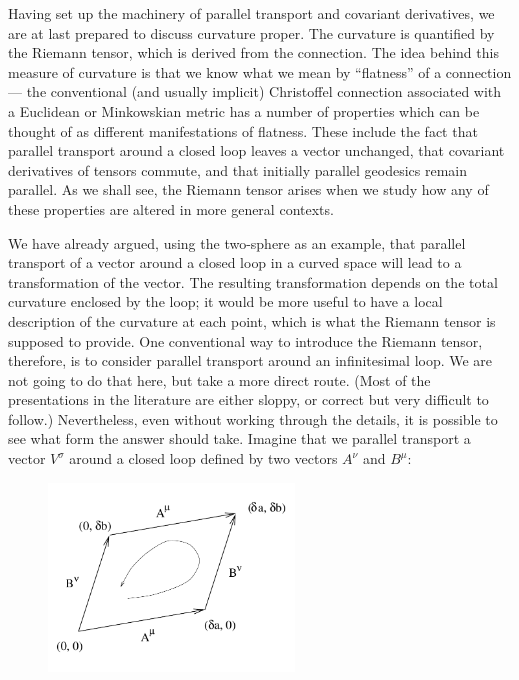 \documentclass[12pt]{article}
\begin{document}
Having set up the machinery of parallel transport and covariant
derivatives, we are at last prepared to discuss curvature proper.
The curvature is quantified by the Riemann tensor, which is derived
from the connection.  The idea behind this measure of curvature
is that we know what we mean by ``flatness'' of a connection ---
the conventional (and usually implicit) Christoffel connection
associated with a Euclidean or Minkowskian metric has a number of
properties which can be thought of as different manifestations 
of flatness.  These include the fact that parallel transport around
a closed loop leaves a vector unchanged, that covariant derivatives
of tensors commute, and that initially parallel geodesics remain
parallel.  As we shall see, the Riemann tensor arises when we 
study how any of these properties are altered in more general
contexts.

We have already argued, using the two-sphere as an example, that parallel
transport of a vector around a closed loop in a curved space will lead 
to a transformation of the vector.  The resulting transformation 
depends on the total curvature enclosed by the loop; it would be more
useful to have a local description of the curvature at each point,
which is what the Riemann tensor is supposed to provide.
One conventional way to introduce the Riemann tensor, therefore,
is to consider parallel transport around an 
infinitesimal loop.  We are not going to do that here, but take a 
more direct route.  (Most of the presentations in the literature are
either sloppy, or correct but very difficult to follow.)  Nevertheless,
even without working through the details, it is possible to see what
form the answer should take.  Imagine that we parallel transport a
vector $V^\sigma$ around a closed loop defined by two vectors $A^\nu$ and 
$B^\mu$:

\begin{figure}[h]
  \centerline{
  \includegraphics[height=5cm]{pdf/three7}}
\end{figure}
\end{document}
